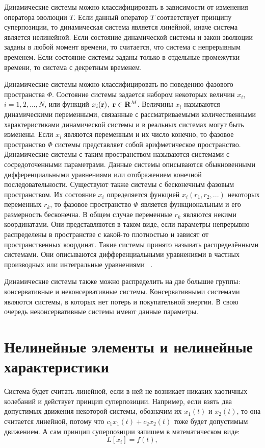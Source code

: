 Динамические системы можно классифицировать в зависимости от изменения оператора эволюции $T$. Если данный оператор $T$ соответствует принципу суперпозиции, то динамическая система является линейной, иначе система является нелинейной. Если состояние динамической системы и закон эволюции заданы в любой момент времени, то считается, что система с непрерывным временем. Если состояние системы заданы только в отдельные промежутки времени, то система с декретным временем. 

Динамические системы можно классифицировать по поведению фазового пространства $\Phi$. Состояние системы задается набором некоторых величин $x_i$, $i=1,2,...,N$, или функций $x_i \bold{(r)}$, $\bold r \in \bold{R}^M$. Величины $x_i$ называются динамическими переменными, связанные с рассматриваемыми количественными характеристиками динамической системы и в реальных системах могут быть изменены. Если $x_i$ являются переменным и их число конечно, то фазовое пространство $\Phi$ системы представляет собой арифметическое пространство. Динамические системы с таким пространством называются системами с сосредоточенными параметрами. Данные системы описываются обыкновенными дифференциальными уравнениями или отображением конечной последовательности. Существуют также системы с бесконечным фазовым пространством. Их состояние $x_i$ определяется функцией $x_i (r_1, r_2,...)$ некоторых переменных $r_k$, то фазовое пространство $\Phi$ является функциональным и его размерность бесконечна. В общем случае переменные $r_k$ являются некими координатами. Они представляются в таком виде, если параметры непрерывно распределены в пространстве с какой-то плотностью и зависят от пространственных координат. Такие системы принято называть распределёнными системами. Они описываются дифференциальными уравнениями в частных производных или интегральные уравнениями ~\cite{8604443}. 

Динамические системы также можно распределить на две большие группы: консервативные и неконсервативные системы. Консервативными системами являются системы, в которых нет потерь и покупательной энергии. В свою очередь неконсервативные системы имеют данные параметры. 

\section{Нелинейные элементы и нелинейные характеристики}

Система будет считать линейной, если в ней не возникает никаких хаотичных колебаний и действует принцип суперпозиции. Например, если взять два допустимых движения некоторой системы, обозначим их $x_1(t)$ и $x_2(t)$, то она считается линейной, потому что $c_1 x_1(t)+c_2 x_2(t)$ тоже будет допустимым движением. А сам принцип суперпозиции запишем в математическом виде:
\begin{equation}
L[x_i] = f(t),
\end{equation}

